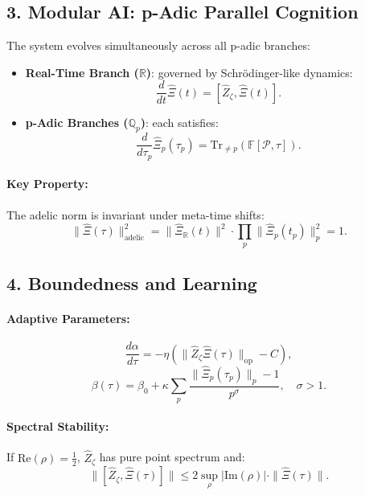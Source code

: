\documentclass[12pt]{article}
\theoremstyle{plain}
\begin{document}
\subsection*{3. Modular AI: p-Adic Parallel Cognition}

The system evolves simultaneously across all p-adic branches:

\begin{itemize}
    \item \textbf{Real-Time Branch (\( \mathbb{R} \))}: governed by Schrödinger-like dynamics:
    \[
    \frac{d}{dt} \hat{\Xi}(t) = [\hat{Z}_\zeta, \hat{\Xi}(t)].
    \]

    \item \textbf{p-Adic Branches (\( \mathbb{Q}_p \))}: each satisfies:
    \[
    \frac{d}{d\tau_p} \hat{\Xi}_p(\tau_p) = \text{Tr}_{\neq p} \left( \mathbb{F}[\mathcal{P}, \tau] \right).
    \]
\end{itemize}

\paragraph*{Key Property:} The adelic norm is invariant under meta-time shifts:
\[
\| \hat{\Xi}(\tau) \|_{\text{adelic}}^2 = \| \hat{\Xi}_\mathbb{R}(t) \|^2 \cdot \prod_p \| \hat{\Xi}_p(t_p) \|_p^2 = 1.
\]

\subsection*{4. Boundedness and Learning}

\paragraph*{Adaptive Parameters:}

\[
\frac{d\alpha}{d\tau} = -\eta \left( \| \hat{Z}_\zeta \hat{\Xi}(\tau) \|_{\text{op}} - C \right),
\]
\[
\beta(\tau) = \beta_0 + \kappa \sum_p \frac{\| \hat{\Xi}_p(\tau_p) \|_p - 1}{p^\sigma}, \quad \sigma > 1.
\]

\paragraph*{Spectral Stability:}

If \( \text{Re}(\rho) = \frac{1}{2} \), \( \hat{Z}_\zeta \) has pure point spectrum and:
\[
\| [\hat{Z}_\zeta, \hat{\Xi}(\tau)] \| \leq 2 \sup_\rho |\text{Im}(\rho)| \cdot \| \hat{\Xi}(\tau) \|.
\]
\end{document}
